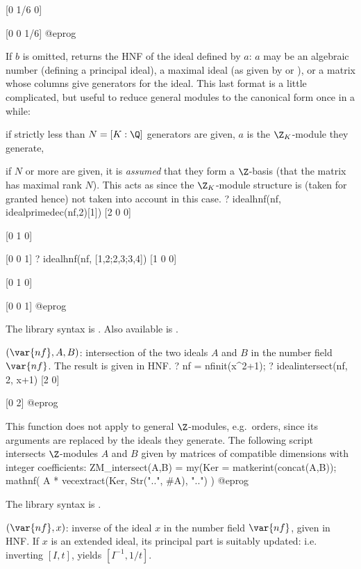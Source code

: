 [0 1/6 0]

[0 0 1/6]
@eprog

If $b$ is omitted, returns the HNF of the ideal defined by $a$: $a$ may be an
algebraic number (defining a principal ideal), a maximal ideal (as given by
 or ), or a matrix whose columns give
generators for the ideal. This last format is a little complicated, but
useful to reduce general modules to the canonical form once in a while:

\item if strictly less than $N = [K:\Q]$ generators are given, $a$
is the $\Z_K$-module they generate,

\item if $N$ or more are given, it is \emph{assumed} that they form a
$\Z$-basis (that the matrix has maximal rank $N$). This acts
as  since the $\Z_K$-module structure is (taken for
granted hence) not taken into account in this case.
\bprog
? idealhnf(nf, idealprimedec(nf,2)[1])
[2 0 0]

[0 1 0]

[0 0 1]
? idealhnf(nf, [1,2;2,3;3,4])
[1 0 0]

[0 1 0]

[0 0 1]
@eprog

The library syntax is .
Also available is .

$(\var{nf},A,B)$: \label{se:idealintersect}intersection of the two ideals
$A$ and $B$ in the number field $\var{nf}$. The result is given in HNF.
\bprog
? nf = nfinit(x^2+1);
? idealintersect(nf, 2, x+1)
[2 0]

[0 2]
@eprog

This function does not apply to general $\Z$-modules, e.g.~orders, since its
arguments are replaced by the ideals they generate. The following script
intersects $\Z$-modules $A$ and $B$ given by matrices of compatible
dimensions with integer coefficients:
\bprog
ZM_intersect(A,B) =
{ my(Ker = matkerint(concat(A,B));
  mathnf( A * vecextract(Ker, Str("..", #A), "..") )
}
@eprog

The library syntax is .

$(\var{nf},x)$: \label{se:idealinv}inverse of the ideal $x$ in the
number field $\var{nf}$, given in HNF. If $x$ is an extended
ideal, its principal part is suitably
updated: i.e. inverting $[I,t]$, yields $[I^{-1}, 1/t]$.

